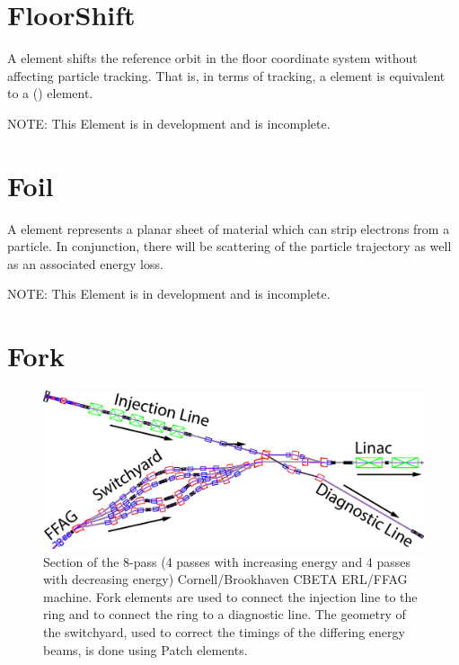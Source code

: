 \section{FloorShift}
\label{s:floorshift}

A  element shifts the reference orbit in the floor coordinate system without
affecting particle tracking. That is, in terms of tracking, a  element is equivalent
to a  () element. 

NOTE: This Element is in development and is incomplete.

\section{Foil}
\label{s:foil}

A  element represents a planar sheet of material which can strip electrons from a particle.
In conjunction, there will be scattering of the particle trajectory as well as an associated energy
loss.

NOTE: This Element is in development and is incomplete.

\section{Fork}
\label{s:fork}

\begin{figure}[tb]
  \centering
  \includegraphics[width=5in]{fork-patch.pdf}
  \caption[Cornell/Brookhaven CBETA ERL/FFAG machine with fork elements.]
  {
Section of the 8-pass (4 passes with increasing energy and 4 passes with decreasing energy) 
Cornell/Brookhaven CBETA ERL/FFAG machine. Fork elements are used to connect the 
injection line to the ring and to connect the ring to a diagnostic line. The geometry of the
switchyard, used to correct the timings of the differing energy beams, is done using Patch elements.
  }
  \label{f:fork.cbeta}
\end{figure}

